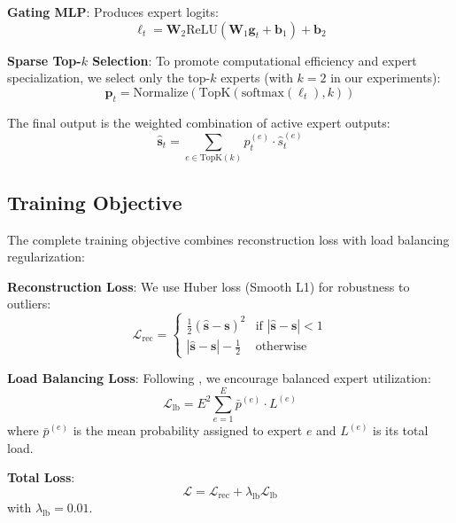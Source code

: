 \documentclass{article}
\begin{document}
\textbf{Gating MLP}: Produces expert logits:
\begin{equation}
\boldsymbol{\ell}_t = \mathbf{W}_2 \text{ReLU}(\mathbf{W}_1 \mathbf{g}_t + \mathbf{b}_1) + \mathbf{b}_2
\end{equation}

\textbf{Sparse Top-$k$ Selection}: To promote computational efficiency and expert specialization, we select only the top-$k$ experts (with $k=2$ in our experiments):
\begin{equation}
\mathbf{p}_t = \text{Normalize}(\text{TopK}(\text{softmax}(\boldsymbol{\ell}_t), k))
\end{equation}

The final output is the weighted combination of active expert outputs:
\begin{equation}
\hat{\mathbf{s}}_t = \sum_{e \in \text{TopK}(k)} p_t^{(e)} \cdot \hat{s}_t^{(e)}
\end{equation}

\subsection{Training Objective}

The complete training objective combines reconstruction loss with load balancing regularization:

\textbf{Reconstruction Loss}: We use Huber loss (Smooth L1) for robustness to outliers:
\begin{equation}
\mathcal{L}_{\text{rec}} = \begin{cases}
\frac{1}{2}(\hat{\mathbf{s}} - \mathbf{s})^2 & \text{if } |\hat{\mathbf{s}} - \mathbf{s}| < 1\\
|\hat{\mathbf{s}} - \mathbf{s}| - \frac{1}{2} & \text{otherwise}
\end{cases}
\end{equation}

\textbf{Load Balancing Loss}: Following \cite{fedus2022switch}, we encourage balanced expert utilization:
\begin{equation}
\mathcal{L}_{\text{lb}} = E^2 \sum_{e=1}^{E} \bar{p}^{(e)} \cdot L^{(e)}
\end{equation}
where $\bar{p}^{(e)}$ is the mean probability assigned to expert $e$ and $L^{(e)}$ is its total load.

\textbf{Total Loss}:
\begin{equation}
\mathcal{L} = \mathcal{L}_{\text{rec}} + \lambda_{\text{lb}} \mathcal{L}_{\text{lb}}
\end{equation}
with $\lambda_{\text{lb}} = 0.01$.
\end{document}
